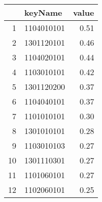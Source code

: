 \begin{table}[ht]
\centering
\begin{tabular}{rlr}
  \hline
 & keyName & value \\ 
  \hline
1 & 1104010101 & 0.51 \\ 
  2 & 1301120101 & 0.46 \\ 
  3 & 1104020101 & 0.44 \\ 
  4 & 1103010101 & 0.42 \\ 
  5 & 1301120200 & 0.37 \\ 
  6 & 1104040101 & 0.37 \\ 
  7 & 1101010101 & 0.30 \\ 
  8 & 1301010101 & 0.28 \\ 
  9 & 1103010103 & 0.27 \\ 
  10 & 1301110301 & 0.27 \\ 
  11 & 1101060101 & 0.27 \\ 
  12 & 1102060101 & 0.25 \\ 
   \hline
\end{tabular}
\end{table}
